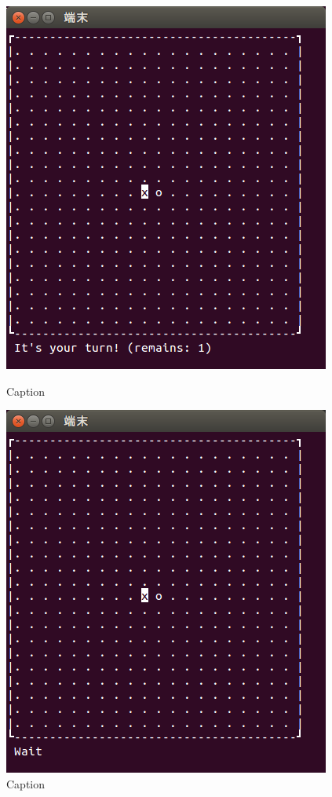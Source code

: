 \documentclass[a4j, titlepage, 10pt]{jsarticle}
\begin{document}
\begin{figure}[H]
  \begin{minipage}{0.5\hsize}
    \centering
    \includegraphics[scale=0.5]{img/put2-1.png}
    \caption{Caption}
    \label{fig:put2-1.png}
  \end{minipage}
  \begin{minipage}{0.5\hsize}
    \includegraphics[scale=0.5]{img/put2-2.png}
    \caption{Caption}
    \label{fig:put2-2.png}
  \end{minipage}
\end{figure}
\end{document}

